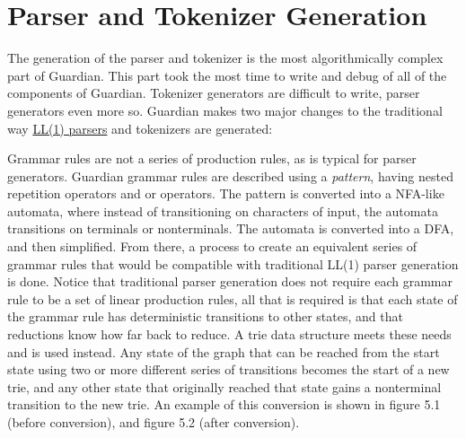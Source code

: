 
\section{Parser and Tokenizer Generation}
{
	The generation of the parser and tokenizer is the most
	algorithmically complex part of Guardian.
	This part took the most time to write
	and debug of all of the components of Guardian.
	Tokenizer generators are difficult to write, parser generators even more
	so.
	Guardian makes two major changes to the traditional
	way \href{https://en.wikipedia.org/wiki/LL_parser}{LL(1) parsers}
	and tokenizers are generated:
	
	\begin{enumerate}
	{
		\item Grammar rules are not a series of production rules, as is
			typical for parser generators. Guardian grammar rules are
			described using a \textit{pattern}, having nested repetition
			operators and or operators.
			The pattern is converted into a NFA-like automata, where instead
			of transitioning on characters of input, the automata transitions
			on terminals or nonterminals. The automata is converted into a
			DFA, and then simplified. From there, a process to create an
			equivalent series of grammar rules that would be compatible
			with traditional LL(1) parser generation is done. Notice
			that traditional parser generation does not require each grammar
			rule to be a set of linear production rules, all that is required
			is that each state of the grammar rule has
			deterministic transitions to other states,
			and that reductions know how far back to reduce.
			A trie data structure meets these needs and is used instead.
			Any state of the graph that can be reached from the start state
			using two or more different series of transitions becomes
			the start of a
			new trie,
			and any other state that originally reached that state gains a
			nonterminal transition to the new trie. An example of this
			conversion is shown in figure 5.1 (before conversion), and
			figure 5.2 (after conversion).
			
			\begin{figure}
				\begin{center}
\end{center}
\end{figure}}
\end{enumerate}}

